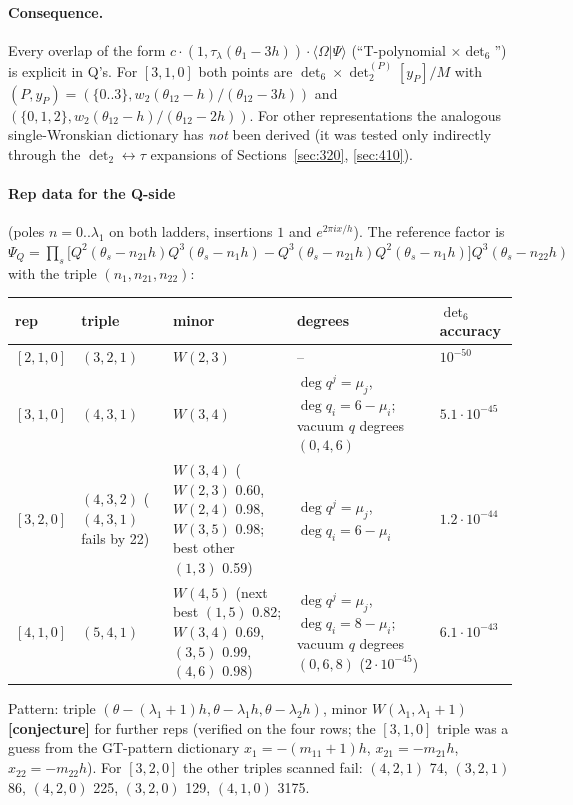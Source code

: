\documentclass[11pt]{article}
\newcommand{\Om}{\Omega}
\newcommand{\thh}{\theta_{12}}
\newcommand{\cj}{\textbf{[conjecture]}}
\begin{document}
\paragraph{Consequence.} Every overlap of the form $c\cdot(1,\tau_\lambda(\theta_1-3h))\cdot\langle\Om|\Psi\rangle$ (``T-polynomial $\times\det_6$'') is explicit in Q's. For $[3,1,0]$ both points are $\det_6\times\det_2^{(P)}[y_P]/M$ with $(P,y_P)=(\{0..3\},w_2(\thh-h)/(\thh-3h))$ and $(\{0,1,2\},w_2(\thh-h)/(\thh-2h))$. For other representations the analogous single-Wronskian dictionary has \emph{not} been derived (it was tested only indirectly through the $\det_2\leftrightarrow\tau$ expansions of Sections~\ref{sec:320}, \ref{sec:410}).

\paragraph{Rep data for the Q-side} (poles $n=0..\lambda_1$ on both ladders, insertions $1$ and $e^{2\pi ix/h}$). The reference factor is $\Psi_Q=\prod_s\big[Q^2(\theta_s-n_{21}h)Q^3(\theta_s-n_1h)-Q^3(\theta_s-n_{21}h)Q^2(\theta_s-n_1h)\big]Q^3(\theta_s-n_{22}h)$ with the triple $(n_1,n_{21},n_{22})$:
\begin{center}\small
\begin{tabular}{@{}lllll@{}}\toprule
rep & triple & minor & degrees & $\det_6$ accuracy\\\midrule
$[2,1,0]$ & $(3,2,1)$ & $W(2,3)$ & -- & $10^{-50}$\\
$[3,1,0]$ & $(4,3,1)$ & $W(3,4)$ & $\deg q^j=\mu_j$, $\deg q_i=6-\mu_i$; vacuum $q$ degrees $(0,4,6)$ & $5.1\cdot10^{-45}$\\
$[3,2,0]$ & $(4,3,2)$ ($(4,3,1)$ fails by 22) & $W(3,4)$ ($W(2,3)$ 0.60, $W(2,4)$ 0.98, $W(3,5)$ 0.98; best other $(1,3)$ 0.59) & $\deg q^j=\mu_j$, $\deg q_i=6-\mu_i$ & $1.2\cdot10^{-44}$\\
$[4,1,0]$ & $(5,4,1)$ & $W(4,5)$ (next best $(1,5)$ 0.82; $W(3,4)$ 0.69, $(3,5)$ 0.99, $(4,6)$ 0.98) & $\deg q^j=\mu_j$, $\deg q_i=8-\mu_i$; vacuum $q$ degrees $(0,6,8)$ ($2\cdot10^{-45}$) & $6.1\cdot10^{-43}$\\\bottomrule
\end{tabular}
\end{center}
Pattern: triple $(\theta-(\lambda_1+1)h,\theta-\lambda_1h,\theta-\lambda_2h)$, minor $W(\lambda_1,\lambda_1+1)$ \cj{} for further reps (verified on the four rows; the $[3,1,0]$ triple was a guess from the GT-pattern dictionary $x_1=-(m_{11}+1)h$, $x_{21}=-m_{21}h$, $x_{22}=-m_{22}h$). For $[3,2,0]$ the other triples scanned fail: $(4,2,1)$ 74, $(3,2,1)$ 86, $(4,2,0)$ 225, $(3,2,0)$ 129, $(4,1,0)$ 3175.
\end{document}
